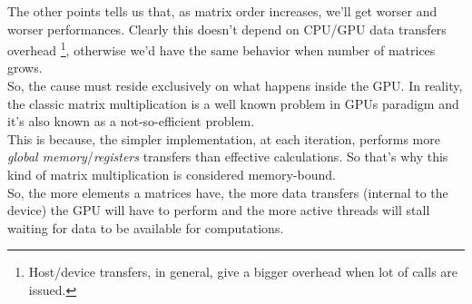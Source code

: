 The other points tells us that, as matrix order increases, we'll get worser and worser performances. Clearly this doesn't depend on CPU/GPU data transfers overhead \footnote{Host/device transfers, in general, give a bigger overhead when lot of calls are issued.}, otherwise we'd have the same behavior when number of matrices grows.\\
So, the cause must reside exclusively on what happens inside the GPU. In reality, the classic matrix multiplication is a well known problem in GPUs paradigm and it's also known as a not-so-efficient problem. \\
This is because, the simpler implementation, at each iteration, performs more \textit{global memory}/\textit{registers} transfers than effective calculations. So that's why this kind of matrix multiplication is considered memory-bound.\\
So, the more elements a matrices have, the more data transfers (internal to the device) the GPU will have to perform and the more active threads will stall waiting for data to be available for computations.\\

